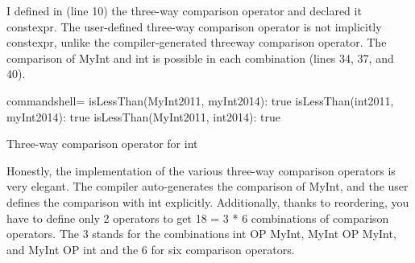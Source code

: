 I defined in (line 10) the three-way comparison operator and declared it constexpr. The user-defined three-way comparison operator is not implicitly constexpr, unlike the compiler-generated threeway comparison operator. The comparison of MyInt and int is possible in each combination (lines 34, 37, and 40).

\begin{tcblisting}{commandshell={}}
isLessThan(MyInt2011, myInt2014): true
isLessThan(int2011, myInt2014): true
isLessThan(MyInt2011, int2014): true
\end{tcblisting}

\begin{center}
Three-way comparison operator for int
\end{center}

Honestly, the implementation of the various three-way comparison operators is very elegant. The compiler auto-generates the comparison of MyInt, and the user defines the comparison with int explicitly. Additionally, thanks to reordering, you have to define only 2 operators to get 18 = 3 * 6 combinations of comparison operators. The 3 stands for the combinations int OP MyInt, MyInt OP MyInt, and MyInt OP int and the 6 for six comparison operators.

















